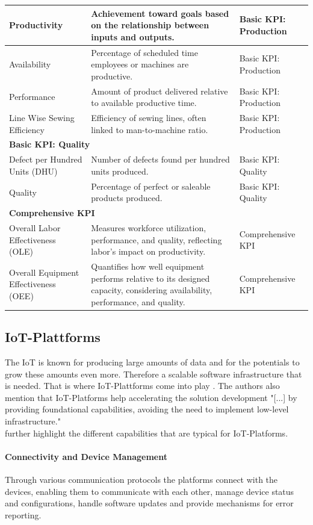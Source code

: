 \begin{longtable}{|p{3cm}|p{7cm}|p{4cm}|}
	\hline
	Productivity & Achievement toward goals based on the relationship between inputs and outputs. & Basic KPI: Production \\
	\hline
	Availability & Percentage of scheduled time employees or machines are productive. & Basic KPI: Production \\
	\hline
	Performance & Amount of product delivered relative to available productive time. & Basic KPI: Production \\
	\hline
	Line Wise Sewing Efficiency & Efficiency of sewing lines, often linked to man-to-machine ratio. & Basic KPI: Production \\
	\hline
	\multicolumn{3}{|l|}{\textbf{Basic KPI: Quality}} \\
	\hline
	Defect per Hundred Units (DHU) & Number of defects found per hundred units produced. & Basic KPI: Quality \\
	\hline
	Quality & Percentage of perfect or saleable products produced. & Basic KPI: Quality \\
	\hline
	\multicolumn{3}{|l|}{\textbf{Comprehensive KPI}} \\
	\hline
	Overall Labor Effectiveness (OLE) & Measures workforce utilization, performance, and quality, reflecting labor's impact on productivity. & Comprehensive KPI \\
	\hline
	Overall Equipment Effectiveness (OEE) & Quantifies how well equipment performs relative to its designed capacity, considering availability, performance, and quality. & Comprehensive KPI \\
	\hline
\end{longtable}
\subsection{IoT-Plattforms}
The IoT is known for producing large amounts of data and for the potentials to grow these amounts even more. Therefore a scalable software infrastructure that is needed. That is where IoT-Plattforms come into play \cite{turkiEvaluatingOpenSource2024}. The authors also mention that IoT-Platforms help accelerating the solution development "[...] by providing foundational capabilities, avoiding the need to implement low-level infrastructure."
\\\cite{asemaniUnderstandingIoTPlatforms2019} further highlight the different capabilities that are typical for IoT-Platforms.
\paragraph{Connectivity and Device Management}
Through various communication protocols the platforms connect with the devices, enabling them to communicate with each other, manage device status and configurations, handle software updates and provide mechanisms for error reporting.
